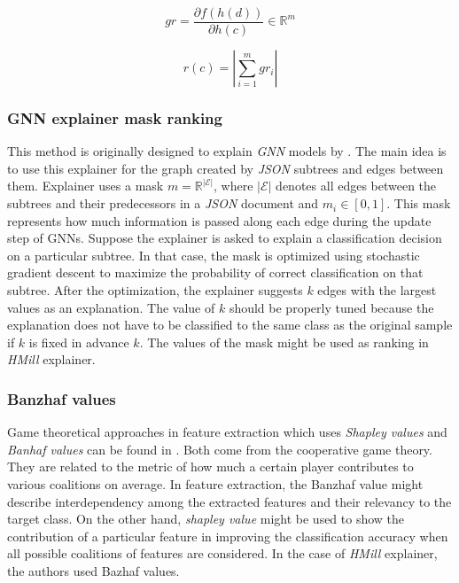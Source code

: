 \begin{equation} \label{eq:grad}
    gr=\frac{\partial f(h(d))}{\partial h(c)} \in \mathbb{R}^m
\end{equation}

\begin{equation} \label{eq:grad2}
    r(c)=|\sum_{i=1}^{m}gr_i|
\end{equation}

\subsubsection{GNN explainer mask ranking}
This method is originally designed to explain \emph{GNN} models by \cite{Ying2019}. The main idea is to use this explainer for the graph created by \emph{JSON} subtrees and edges between them. Explainer uses a mask $m=\mathbb{R}^{|\mathcal{E}|}$, where $|\mathcal{E}|$ denotes all edges between the subtrees and their predecessors in a \emph{JSON} document and $m_i\in[0,1]$. This mask represents how much information is passed along each edge during the update step of GNNs. Suppose the explainer is asked to explain a classification decision on a particular subtree. In that case, the mask is optimized using stochastic gradient descent to maximize the probability of correct classification on that subtree. After the optimization, the explainer suggests $k$ edges with the largest values as an explanation. The value of $k$ should be properly tuned because the explanation does not have to be classified to the same class as the original sample if $k$ is fixed in advance $k$. The values of the mask might be used as ranking in \emph{HMill} explainer.

\subsubsection{Banzhaf values}
Game theoretical approaches in feature extraction which uses \emph{Shapley values} and \emph{Banhaf values} can be found in \cite{Afghah2018}. Both come from the cooperative game theory. They are related to the metric of how much a certain player contributes to various coalitions on average. In feature extraction, the Banzhaf value might describe interdependency among the extracted features and their relevancy to the target class. On the other hand, \emph{shapley value} might be used to show the contribution of a particular feature in improving the classification accuracy when all possible coalitions of features are considered. In the case of \emph{HMill} explainer, the authors used Bazhaf values. 

